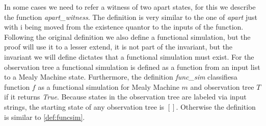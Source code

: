 In some cases we need to refer a witness of two apart states, for this we describe the function \textit{apart\_witness}. The definition is very similar to the one of \textit{apart} just with i being moved from the existence quantor to the inputs of the function.\\
Following the original definition we also define a functional simulation, but the proof will use it to a lesser extend, it is not part of the invariant, but the invariant we will define dictates that a functional simulation must exist. For the observation tree a functional simulation is defined as a function from an input list to a Mealy Machine state. Furthermore, the definition \textit{func\_sim} classifiesa function $f$ as a functional simulation for Mealy Machine $m$ and observation tree $T$ if it returns \textit{True}. Because states in the observation tree are labeled via input strings, the starting state of any observation tree is $[]$. Otherwise the definition is similar to \autoref{def:funcsim}. 
\begin{myisabelle}
	\funcsim
\end{myisabelle}
